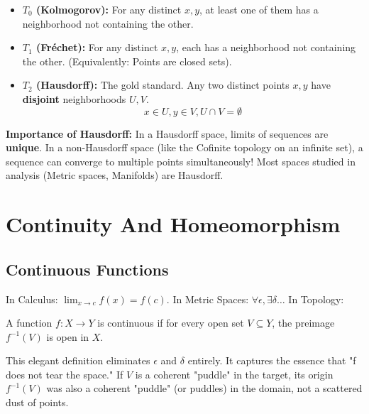 \begin{itemize}
    \item \textbf{$T_0$ (Kolmogorov):} For any distinct $x, y$, at least one of them has a neighborhood not containing the other.
    \item \textbf{$T_1$ (Fréchet):} For any distinct $x, y$, each has a neighborhood not containing the other. (Equivalently: Points are closed sets).
    \item \textbf{$T_2$ (Hausdorff):} The gold standard. Any two distinct points $x, y$ have \textbf{disjoint} neighborhoods $U, V$.
    \[ x \in U, y \in V, U \cap V = \emptyset \]
\end{itemize}

\textbf{Importance of Hausdorff:} In a Hausdorff space, limits of sequences are \textbf{unique}. In a non-Hausdorff space (like the Cofinite topology on an infinite set), a sequence can converge to multiple points simultaneously! Most spaces studied in analysis (Metric spaces, Manifolds) are Hausdorff.

\section{Continuity And Homeomorphism}

\subsection{Continuous Functions}
In Calculus: $\lim_{x\to c} f(x) = f(c)$.
In Metric Spaces: $\forall \epsilon, \exists \delta \dots$
In Topology:
\begin{definition}
A function $f: X \to Y$ is continuous if for every open set $V \subseteq Y$, the preimage $f^{-1}(V)$ is open in $X$.
\end{definition}
This elegant definition eliminates $\epsilon$ and $\delta$ entirely. It captures the essence that "f does not tear the space." If $V$ is a coherent "puddle" in the target, its origin $f^{-1}(V)$ was also a coherent "puddle" (or puddles) in the domain, not a scattered dust of points.

